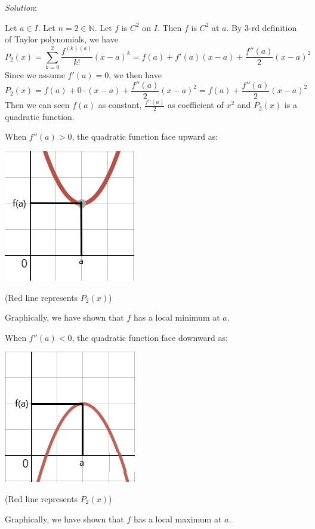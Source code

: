 \documentclass[12pt]{exam}
\newcommand{\N}{\mathbb{N}}
\begin{document}
\begin{enumerate}
\begin{enumerate}
						\emph{Solution}:
			
			Let $a \in I$.
			Let $n=2\in\N$.
			Let $f$ is $C^2$ on $I$.
			Then $f$ is $C^2$ at $a$.
			By 3-rd definition of Taylor polynomials, we have
			$$
			    P_2(x)=\sum_{k=0}^2 \frac{f^{(k)(a)}}{k!}(x-a)^k=f(a)+f'(a)(x-a)+\frac{f''(a)}{2}(x-a)^2
			$$
			Since we assume $f'(a) = 0$, we then have
			$$
			    P_2(x)=f(a)+0\cdot(x-a)+\frac{f''(a)}{2}(x-a)^2=f(a)+\frac{f''(a)}{2}(x-a)^2
			$$
			Then we can seen $f(a)$ as constant, $\frac{f''(a)}{2}$ as coefficient of $x^2$ and $P_2(x)$ is a quadratic function.
			
			When $f''(a)>0$, the quadratic function face upward as:
			\begin{center}
			    \includegraphics[scale=0.75]{Upward}
			    
			    (Red line represents $P_2(x)$)
			\end{center}
			Graphically, we have shown that $f$ has a local minimum at $a$.
			
			\newpage
			
			When $f''(a)<0$, the quadratic function face downward as:
			\begin{center}
			    \includegraphics[scale=0.75]{Downward}
			    
			    (Red line represents $P_2(x)$)
			\end{center}
			Graphically, we have shown that $f$ has a local maximum at $a$.
			

\end{enumerate}
\end{enumerate}
\end{document}
